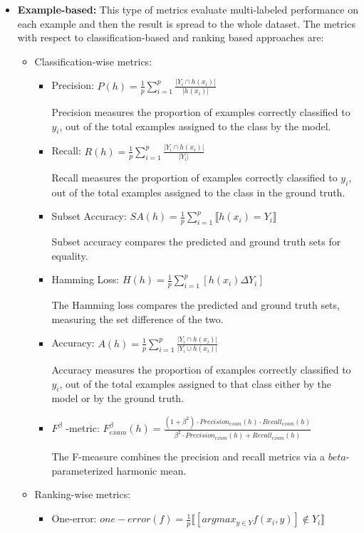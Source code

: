 \documentclass[12pt]{report}
\begin{document}
	\begin{itemize}
		\item \textbf{Example-based: } This type of metrics evaluate multi-labeled
      performance on each example and then the result is spread to the whole
      dataset. The metrics with respect to classification-based and ranking
      based approaches are:
      
		\begin{itemize}
			\item Classification-wise metrics:
			\begin{itemize}
				\item Precision: $P(h) = \frac{1}{p} \sum_{i=1}^{p} \frac{|Y_i \cap h(x_i)|}{|h(x_i)|}$

          Precision measures the proportion of examples correctly classified to $y_i$, out
          of the total examples assigned to the class by the model.
				\item Recall: $R(h) = \frac{1}{p} \sum_{i=1}^{p} \frac{|Y_i \cap h(x_i)|}{|Y_i|}$

          Recall measures the proportion of examples correctly classified to $y_i$, out
          of the total examples assigned to the class in the ground truth.
        \item Subset Accuracy:  $SA(h) = \frac{1}{p} \sum_{i=1}^p \llbracket h(x_i) = Y_i \rrbracket$

          Subset accuracy compares the predicted and ground truth sets for equality.
				\item Hamming Loss: $H(h) = \frac{1}{p} \sum_{i=1}^{p} [h(x_i)\Delta Y_i] $

          The Hamming loss compares the predicted and ground truth sets,
          measuring the set difference of the two.
				\item Accuracy: $A(h) = \frac{1}{p} \sum_{i=1}^{p} \frac{|Y_i \cap h(x_i)|}{|Y_i \cup h(x_i)|}$
          
          Accuracy measures the proportion of examples correctly classified to
          $y_i$, out of the total examples assigned to that class either by the
          model or by the ground truth.
				\item $F^ \beta$ -metric:  $F^ \beta _{exam} (h) = \frac{(1+ \beta ^2) \cdot Precision_{exam}(h) \cdot Recall_{exam}(h)}{\beta ^2 \cdot Precision_{exam}(h) + Recall_{exam}(h)}$
          
          The F-measure combines the precision and recall metrics via a $beta$-
          parameterized harmonic mean.
			\end{itemize}
			\item Ranking-wise metrics:
			\begin{itemize}
				\item One-error: $one-error(f) = \frac{1}{p} \llbracket [argmax_{y \in Y}f(x_i,y)] \notin Y_i \rrbracket$


\end{itemize}
\end{itemize}
\end{itemize}
\end{document}
